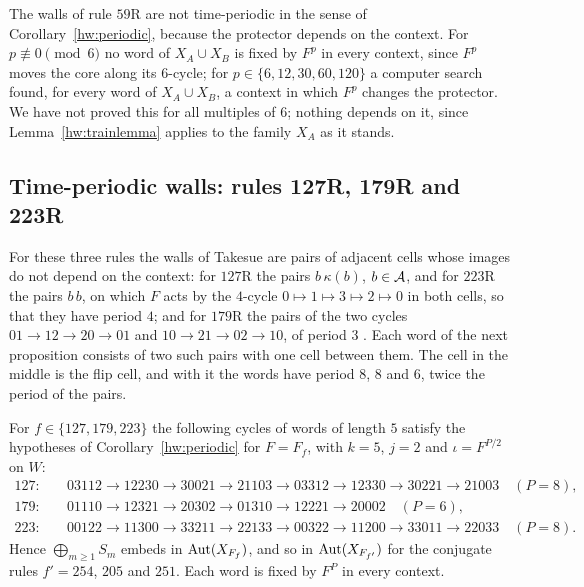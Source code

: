 The walls of rule $59$R are not time-periodic in the sense of Corollary~\ref{hw:periodic}, because the protector depends on the context. For $p\not\equiv0\pmod6$ no word of $X_A\cup X_B$ is fixed by $F^p$ in every context, since $F^p$ moves the core along its $6$-cycle; for $p\in\{6,12,30,60,120\}$ a computer search found, for every word of $X_A\cup X_B$, a context in which $F^p$ changes the protector. We have not proved this for all multiples of $6$; nothing depends on it, since Lemma~\ref{hw:trainlemma} applies to the family $X_A$ as it stands.

\subsection{Time-periodic walls: rules 127R, 179R and 223R}\label{hw:sec:tp}

For these three rules the walls of Takesue are pairs of adjacent cells whose images do not depend on the context: for $127$R the pairs $b\,\kappa(b)$, $b\in\mathcal{A}$, and for $223$R the pairs $b\,b$, on which $F$ acts by the $4$-cycle $0\mapsto1\mapsto3\mapsto2\mapsto0$ in both cells, so that they have period $4$; and for $179$R the pairs of the two cycles $01\to12\to20\to01$ and $10\to21\to02\to10$, of period $3$ \cite[Fig.~2 and Table~III, walls (xii), (xiii), (xv), (xvi)]{Takesue1989}. Each word of the next proposition consists of two such pairs with one cell between them. The cell in the middle is the flip cell, and with it the words have period $8$, $8$ and $6$, twice the period of the pairs.

\begin{proposition}\label{hw:tp}
For $f\in\{127,179,223\}$ the following cycles of words of length $5$ satisfy the hypotheses of Corollary~\ref{hw:periodic} for $F=F_f$, with $k=5$, $j=2$ and $\iota=F^{P/2}$ on $W$:
\begin{align*}
127:&\quad 03112\to12230\to30021\to21103\to03312\to12330\to30221\to21003\quad(P=8),\\
179:&\quad 01110\to12321\to20302\to01310\to12221\to20002\quad(P=6),\\
223:&\quad 00122\to11300\to33211\to22133\to00322\to11200\to33011\to22033\quad(P=8).
\end{align*}
Hence $\bigoplus_{m\ge1}S_m$ embeds in $\operatorname{Aut}(X_{F_f})$, and so in $\operatorname{Aut}(X_{F_{f'}})$ for the conjugate rules $f'=254$, $205$ and $251$. Each word is fixed by $F^P$ in every context.
\end{proposition}

